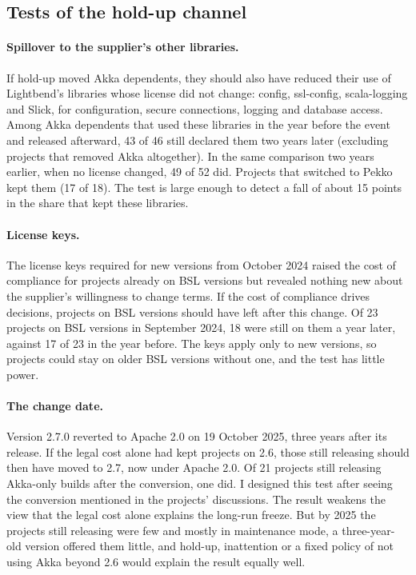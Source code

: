 \documentclass[11pt]{article}
\begin{document}
\subsection{Tests of the hold-up channel}

\paragraph{Spillover to the supplier's other libraries.} If hold-up moved Akka dependents, they should also have reduced their use of Lightbend's libraries whose license did not change: config, ssl-config, scala-logging and Slick, for configuration, secure connections, logging and database access. Among Akka dependents that used these libraries in the year before the event and released afterward, 43 of 46 still declared them two years later (excluding projects that removed Akka altogether). In the same comparison two years earlier, when no license changed, 49 of 52 did. Projects that switched to Pekko kept them (17 of 18). The test is large enough to detect a fall of about 15 points in the share that kept these libraries.

\paragraph{License keys.} The license keys required for new versions from October 2024 raised the cost of compliance for projects already on BSL versions but revealed nothing new about the supplier's willingness to change terms. If the cost of compliance drives decisions, projects on BSL versions should have left after this change. Of 23 projects on BSL versions in September 2024, 18 were still on them a year later, against 17 of 23 in the year before. The keys apply only to new versions, so projects could stay on older BSL versions without one, and the test has little power.

\paragraph{The change date.} Version 2.7.0 reverted to Apache 2.0 on 19 October 2025, three years after its release. If the legal cost alone had kept projects on 2.6, those still releasing should then have moved to 2.7, now under Apache 2.0. Of 21 projects still releasing Akka-only builds after the conversion, one did. I designed this test after seeing the conversion mentioned in the projects' discussions. The result weakens the view that the legal cost alone explains the long-run freeze. But by 2025 the projects still releasing were few and mostly in maintenance mode, a three-year-old version offered them little, and hold-up, inattention or a fixed policy of not using Akka beyond 2.6 would explain the result equally well.
\end{document}
